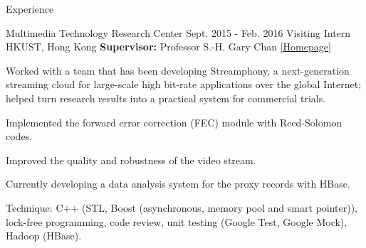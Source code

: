 \documentclass{resume} %
\begin{document}
\begin{rSection}{Experience}
\begin{rExperience}
\end{rExperience}


\begin{rExperience}
	{Multimedia Technology Research Center}
	{Sept. 2015 - Feb. 2016}
	{Visiting Intern}
	{HKUST, Hong Kong}
	{{\bf Supervisor:} Professor S.-H. Gary Chan {\scriptsize {\href{http://www.cse.ust.hk/~gchan/}{[Homepage]}}}}
\item Worked with a team that has been developing Streamphony, a next-generation streaming cloud for large-scale high bit-rate applications over the global Internet; helped turn research results into a practical system for commercial trials.
\item Implemented the forward error correction (FEC) module with Reed-Solomon codes.
\item Improved the quality and robustness of the video stream.
\item Currently developing a data analysis system for the proxy records with HBase.
\item Technique: C++ (STL, Boost (asynchronous, memory pool and smart pointer)), lock-free programming, code review, unit testing (Google Test, Google Mock), Hadoop (HBase).

\end{rExperience}

\end{rSection}

\end{document}
